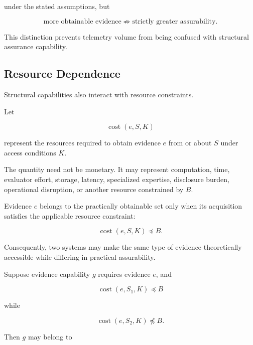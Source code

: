 under the stated assumptions, but

\begin{equation}
  \boxed{
    \text{more obtainable evidence}
    \not\Rightarrow
    \text{strictly greater assurability}.
  }
\end{equation}

This distinction prevents telemetry volume from being confused with structural assurance capability.

\subsection{Resource Dependence}
\label{aa.subsec.resource-dependence}

Structural capabilities also interact with resource constraints.

Let

\begin{equation}
  \operatorname{cost}(e,S,K)
\end{equation}

represent the resources required to obtain evidence \(e\) from or about \(S\) under access conditions \(K\).

The quantity need not be monetary.
It may represent computation, time, evaluator effort, storage, latency, specialized expertise,
disclosure burden, operational disruption, or another resource constrained by \(B\).

Evidence \(e\) belongs to the practically obtainable set only when its acquisition satisfies the applicable resource constraint:

\begin{equation}
  \operatorname{cost}(e,S,K)
  \preceq
  B.
\end{equation}

Consequently, two systems may make the same type of evidence theoretically accessible while differing in practical assurability.

Suppose evidence capability \(g\) requires evidence \(e\), and

\begin{equation}
  \operatorname{cost}(e,S_1,K)
  \preceq
  B
\end{equation}

while

\begin{equation}
  \operatorname{cost}(e,S_2,K)
  \npreceq
  B.
\end{equation}

Then \(g\) may belong to

